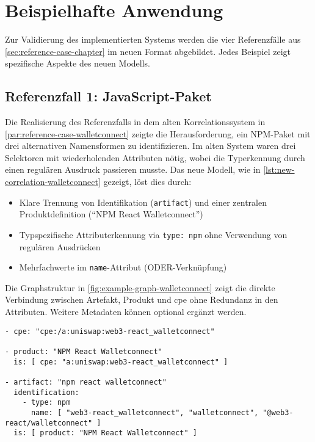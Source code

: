 \section{Beispielhafte Anwendung}\label{sec:beispiele-fertige-implementierung}

Zur Validierung des implementierten Systems werden die vier Referenzfälle aus \autoref{sec:reference-case-chapter} im neuen Format abgebildet.
Jedes Beispiel zeigt spezifische Aspekte des neuen Modells.

\subsection{Referenzfall 1: JavaScript-Paket}\label{subsec:example-js-package}

Die Realisierung des Referenzfalls in dem alten Korrelationssystem in \autoref{par:reference-case-walletconnect} zeigte die Herausforderung, ein NPM-Paket mit drei alternativen Namensformen zu identifizieren.
Im alten System waren drei Selektoren mit wiederholenden Attributen nötig, wobei die Typerkennung durch einen regulären Ausdruck passieren musste.
Das neue Modell, wie in \autoref{lst:new-correlation-walletconnect} gezeigt, löst dies durch:

\begin{itemize}
    \itemsep0em
    \item Klare Trennung von Identifikation (\texttt{artifact}) und einer zentralen Produktdefinition (\enquote{NPM React Walletconnect})
    \item Typspezifische Attributerkennung via \texttt{type: npm} ohne Verwendung von regulären Ausdrücken
    \item Mehrfachwerte im \texttt{name}-Attribut (ODER-Verknüpfung)
\end{itemize}

Die Graphstruktur in \autoref{fig:example-graph-walletconnect} zeigt die direkte Verbindung zwischen Artefakt, Produkt und \acrshort{cpe} ohne Redundanz in den Attributen.
Weitere Metadaten können optional ergänzt werden.

\begin{lstlisting}[style=yaml,caption={Produktmodellierung zu react-walletconnect},label={lst:new-correlation-walletconnect},basicstyle=\ttfamily\scriptsize]
- cpe: "cpe:/a:uniswap:web3-react_walletconnect"

- product: "NPM React Walletconnect"
  is: [ cpe: "a:uniswap:web3-react_walletconnect" ]

- artifact: "npm react walletconnect"
  identification:
    - type: npm
      name: [ "web3-react_walletconnect", "walletconnect", "@web3-react/walletconnect" ]
  is: [ product: "NPM React Walletconnect" ]
\end{lstlisting}

